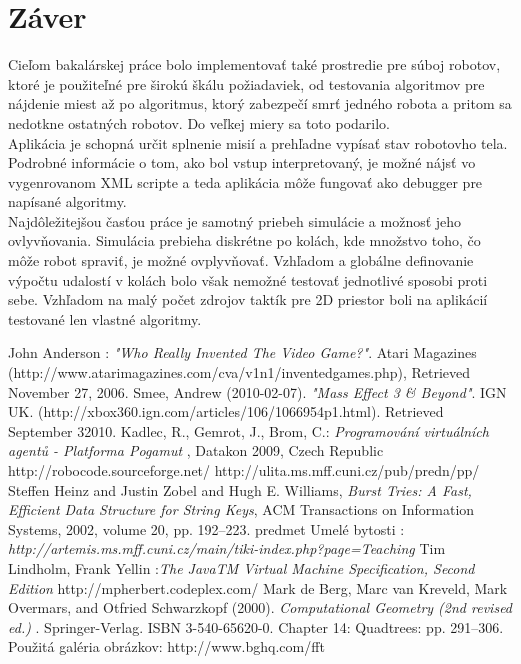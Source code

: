 \documentclass[12pt,notitlepage]{report}
\begin{document}
\chapter{Záver}
Cieľom bakalárskej práce bolo implementovať také prostredie pre súboj robotov, ktoré je použiteľné pre širokú škálu požiadaviek, od testovania algoritmov pre nájdenie miest až po algoritmus, ktorý zabezpečí smrť jedného robota a pritom sa nedotkne ostatných robotov. Do veľkej miery sa toto podarilo. \\
Aplikácia je schopná určit splnenie misií a prehľadne vypísať stav robotovho tela. Podrobné informácie o tom, ako bol vstup interpretovaný, je možné nájsť vo vygenrovanom XML scripte a teda aplikácia môže fungovať ako debugger pre napísané algoritmy.\\
Najdôležitejšou časťou práce je samotný priebeh simulácie a možnosť jeho ovlyvňovania. Simulácia prebieha diskrétne po kolách, kde množstvo toho, čo môže robot spraviť, je možné ovplyvňovať. Vzhľadom a globálne definovanie výpočtu udalostí v kolách bolo však nemožné testovať jednotlivé sposobi proti sebe.
Vzhľadom na malý počet zdrojov taktík pre 2D priestor boli na aplikácií testované len vlastné algoritmy.\\

\newpage
{}
\begin{thebibliography}{99}
John Anderson : \emph{"Who Really Invented The Video Game?"}. Atari Magazines (http://www.atarimagazines.com/cva/v1n1/inventedgames.php),
Retrieved November 27, 2006.
Smee, Andrew (2010-02-07). \emph{"Mass Effect 3 \& Beyond"}. IGN UK. (http://xbox360.ign.com/articles/106/1066954p1.html). Retrieved September 32010.
 Kadlec, R., Gemrot, J., Brom, C.:\emph{ Programování virtuálních agentů - Platforma Pogamut }, Datakon 2009, Czech Republic
 http://robocode.sourceforge.net/
 http://ulita.ms.mff.cuni.cz/pub/predn/pp/
Steffen Heinz and Justin Zobel and Hugh E. Williams,
    \emph{Burst Tries: A Fast, Efficient Data Structure for String Keys},
    ACM Transactions on Information Systems, 2002,
    volume 20, pp. 192--223.
 predmet Umelé bytosti : \emph{http://artemis.ms.mff.cuni.cz/main/tiki-index.php?page=Teaching}
 Tim Lindholm, Frank Yellin :\emph{The JavaTM Virtual Machine Specification, Second Edition}
http://mpherbert.codeplex.com/
   Mark de Berg, Marc van Kreveld, Mark Overmars, and Otfried Schwarzkopf (2000). \emph{ Computational Geometry (2nd revised ed.) }. Springer-Verlag. ISBN 3-540-65620-0.  Chapter 14: Quadtrees: pp. 291–306.
 Použitá galéria obrázkov: http://www.bghq.com/fft 
\end{thebibliography}
\end{document}
